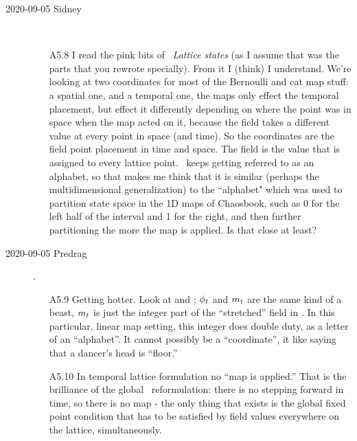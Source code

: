 \begin{description}
%

\item[2020-09-05 Sidney]~~
\begin{itemize}
	\item[A5.8]
I read the pink bits of ~{\em Lattice states} (as I
assume that was the parts that you rewrote specially). From it I (think)
I understand. We're looking at two coordinates for most of the Bernoulli
and cat map stuff: a spatial one, and a temporal one, the maps only
effect the temporal placement, but effect it differently depending on
where the point was in space when the map acted on it, because the field
takes a different value at every point in space (and time). So the
coordinates are the field point placement in time and space. The field is
the value that is assigned to every lattice point. \Mm\ keeps getting
referred to as an alphabet, so that makes me think that it is similar
(perhaps the multidimensional generalization) to the ``alphabet" which was
used to partition state space in the 1D maps of Chaosbook, such as 0 for
the left half of the interval and 1 for the right, and then further
partitioning the more the map is applied. Is that close at least?
\end{itemize}

\item[2020-09-05 Predrag].
\begin{itemize}
	\item[A5.9]
Getting hotter. Look at  and ;
$\phi_{t}$ and ${m_{t}}$ are the same kind of a beast,
${m_{t}}$ is just the integer part of the ``stretched'' field in
. In this particular, linear map setting, this integer
does double duty, as a letter of an ``alphabet''. It cannot possibly be a
``coordinate'', it like saying that a dancer's head is ``floor.''
	\item[A5.10]
In temporal lattice formulation no ``map is applied.'' That is the
brilliance of the global \spt\ reformulation: there is no stepping
forward in time, so there is no map - the only thing that exists is the
global fixed point condition that has to be satisfied by field values
everywhere on the lattice, simultaneously.


\end{itemize}
\end{description}
